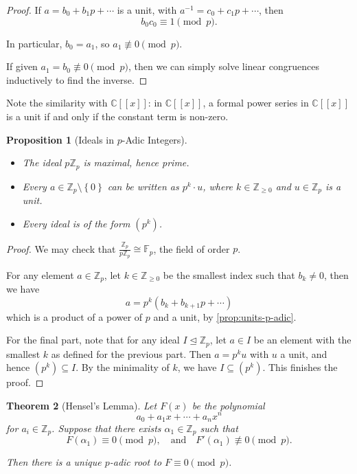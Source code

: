 \documentclass{article}
\newtheorem{theorem}{Theorem}[section]
\newtheorem{proposition}[theorem]{Proposition}
\theoremstyle{definition}
\theoremstyle{remark}
\newcommand{\pqty}[1]{\left(#1\right)}
\newcommand{\Bqty}[1]{\left\{#1\right\}}
\newcommand{\bbrac}[1]{[\![#1]\!]}
\newcommand{\flatfrac}[2]{\frac{#1}{#2}}
\newcommand{\qand}{\quad\text{and}\quad}
\newcommand{\inverse}{^{-1}}
\newcommand{\isomorphic}{\cong}
\newcommand{\idealsub}{\trianglelefteq}
\newcommand{\nequiv}{\not\equiv}
\newcommand{\ZZ}{\mathbb{Z}}
\newcommand{\CC}{\mathbb{C}}
\newcommand{\FF}{\mathbb{F}}
\begin{document}
\begin{proof}
    If \(a = b_0 + b_1 p + \cdots\) is a unit, with \(a\inverse = c_0 + c_1 p + \cdots\), then
    \[
        b_0 c_0 \equiv 1 \pmod{p}.
    \]

    In particular, \(b_0 = a_1\), so \(a_1 \nequiv 0 \pmod{p}\).

    If given \(a_1 = b_0 \nequiv 0 \pmod{p}\), then we can simply solve linear congruences inductively to find the inverse. 
\end{proof}

Note the similarity with \(\CC\bbrac{x}\): in \(\CC\bbrac{x}\), a formal power series in \(\CC\bbrac{x}\) is a unit if and only if the constant term is non-zero.

\begin{proposition}[Ideals in \(p\)-Adic Integers]
    \label{prop:ideals-p-adic}%
    \begin{itemize}
        \item The ideal \(p \ZZ_p\) is maximal, hence prime.
        \item Every \(a \in \ZZ_p \setminus \Bqty{0}\) can be written as \(p^k \cdot u\), where \(k \in \ZZ_{\geq 0}\) and \(u \in \ZZ_p\) is a unit.
        \item Every ideal is of the form \(\pqty{p^k}\).
    \end{itemize}
\end{proposition}

\begin{proof}
    We may check that \(\flatfrac{\ZZ_p}{p \ZZ_p} \isomorphic \FF_p\), the field of order \(p\).
    
    For any element \(a \in \ZZ_p\), let \(k \in \ZZ_{\geq 0}\) be the smallest index such that \(b_k \neq 0\), then we have
    \[
        a = p^k \pqty{b_k + b_{k + 1} p + \cdots}
    \]
    which is a product of a power of \(p\) and a unit, by \autoref{prop:units-p-adic}.

    For the final part, note that for any ideal \(I \idealsub \ZZ_p\), let \(a \in I\) be an element with the smallest \(k\) as defined for the previous part. Then \(a = p^k u\) with \(u\) a unit, and hence \(\pqty{p^k} \subseteq I\). By the minimality of \(k\), we have \(I \subseteq \pqty{p^k}\). This finishes the proof.
\end{proof}

\begin{theorem}[Hensel's Lemma]
    \label{thm:hensel-lemma}%
    Let \(F\pqty{x}\) be the polynomial
    \[
        a_0 + a_1 x + \cdots + a_n x^n
    \]
    for \(a_i \in \ZZ_p\). Suppose that there exists \(\alpha_1 \in \ZZ_p\) such that
    \[
        F\pqty{\alpha_1} \equiv 0 \pmod{p}, \qand F'\pqty{\alpha_1} \nequiv 0 \pmod{p}.
    \]

    Then there is a unique \(p\)-adic root to \(F \equiv 0 \pmod{p}\).
\end{theorem}
\end{document}
